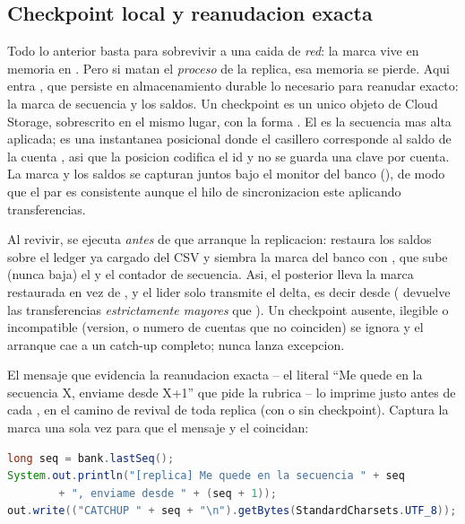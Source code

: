 \subsection{Checkpoint local y reanudacion exacta}

Todo lo anterior basta para sobrevivir a una caida de \emph{red}: la marca vive en
memoria en . Pero si matan el \emph{proceso} de la replica,
esa memoria se pierde. Aqui entra , que
persiste en almacenamiento durable lo necesario para reanudar exacto: la marca de
secuencia y los saldos. Un checkpoint es un unico objeto de Cloud Storage,
sobrescrito en el mismo lugar, con la forma
. El  es la
secuencia mas alta aplicada;  es una instantanea posicional donde
el casillero  corresponde al saldo de la cuenta , asi
que la posicion codifica el id y no se guarda una clave por cuenta. La marca y los
saldos se capturan juntos bajo el monitor del banco (),
de modo que el par es consistente aunque el hilo de sincronizacion este aplicando
transferencias.

Al revivir,  se ejecuta \emph{antes} de que arranque la
replicacion: restaura los saldos sobre el ledger ya cargado del CSV y siembra la
marca del banco con , que sube (nunca baja) el
 y el contador de secuencia. Asi, el  posterior
lleva la marca restaurada  en vez de , y el lider solo
transmite el delta, es decir desde  ( devuelve las
transferencias \emph{estrictamente mayores} que ). Un checkpoint
ausente, ilegible o incompatible (version,  o numero de cuentas que
no coinciden) se ignora y el arranque cae a un catch-up completo; 
nunca lanza excepcion.

El mensaje que evidencia la reanudacion exacta -- el literal ``Me quede en la
secuencia X, enviame desde X+1'' que pide la rubrica -- lo imprime
 justo antes de cada , en el camino
de revival de toda replica (con o sin checkpoint). Captura la marca una sola vez
para que el mensaje y el  coincidan:

\begin{lstlisting}[language=Java,caption={ReplicaSync: imprime el punto de reanudacion antes del CATCHUP}]
long seq = bank.lastSeq();
System.out.println("[replica] Me quede en la secuencia " + seq
        + ", enviame desde " + (seq + 1));
out.write(("CATCHUP " + seq + "\n").getBytes(StandardCharsets.UTF_8));
\end{lstlisting}

